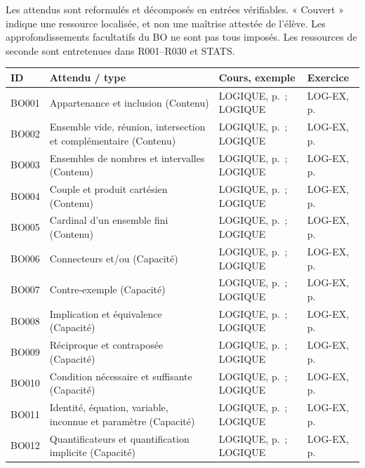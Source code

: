 \label{MATRICE}
Les attendus sont reformulés et décomposés en entrées vérifiables. « Couvert » indique une ressource localisée, et non une maîtrise attestée de l’élève. Les approfondissements facultatifs du BO ne sont pas tous imposés. Les ressources de seconde sont entretenues dans R001–R030 et STATS.
\small\begin{longtable}{p{.1\linewidth}p{.43\linewidth}p{.19\linewidth}p{.16\linewidth}}\toprule ID & Attendu / type & Cours, exemple & Exercice \\\midrule\endhead
BO001 & Appartenance et inclusion (Contenu) & LOGIQUE, p.\,\pageref{LOGIQUE} ; LOGIQUE & LOG-EX, p.\,\pageref{LOG-EX} \\
BO002 & Ensemble vide, réunion, intersection et complémentaire (Contenu) & LOGIQUE, p.\,\pageref{LOGIQUE} ; LOGIQUE & LOG-EX, p.\,\pageref{LOG-EX} \\
BO003 & Ensembles de nombres et intervalles (Contenu) & LOGIQUE, p.\,\pageref{LOGIQUE} ; LOGIQUE & LOG-EX, p.\,\pageref{LOG-EX} \\
BO004 & Couple et produit cartésien (Contenu) & LOGIQUE, p.\,\pageref{LOGIQUE} ; LOGIQUE & LOG-EX, p.\,\pageref{LOG-EX} \\
BO005 & Cardinal d’un ensemble fini (Contenu) & LOGIQUE, p.\,\pageref{LOGIQUE} ; LOGIQUE & LOG-EX, p.\,\pageref{LOG-EX} \\
BO006 & Connecteurs et/ou (Capacité) & LOGIQUE, p.\,\pageref{LOGIQUE} ; LOGIQUE & LOG-EX, p.\,\pageref{LOG-EX} \\
BO007 & Contre-exemple (Capacité) & LOGIQUE, p.\,\pageref{LOGIQUE} ; LOGIQUE & LOG-EX, p.\,\pageref{LOG-EX} \\
BO008 & Implication et équivalence (Capacité) & LOGIQUE, p.\,\pageref{LOGIQUE} ; LOGIQUE & LOG-EX, p.\,\pageref{LOG-EX} \\
BO009 & Réciproque et contraposée (Capacité) & LOGIQUE, p.\,\pageref{LOGIQUE} ; LOGIQUE & LOG-EX, p.\,\pageref{LOG-EX} \\
BO010 & Condition nécessaire et suffisante (Capacité) & LOGIQUE, p.\,\pageref{LOGIQUE} ; LOGIQUE & LOG-EX, p.\,\pageref{LOG-EX} \\
BO011 & Identité, équation, variable, inconnue et paramètre (Capacité) & LOGIQUE, p.\,\pageref{LOGIQUE} ; LOGIQUE & LOG-EX, p.\,\pageref{LOG-EX} \\
BO012 & Quantificateurs et quantification implicite (Capacité) & LOGIQUE, p.\,\pageref{LOGIQUE} ; LOGIQUE & LOG-EX, p.\,\pageref{LOG-EX} \\

\end{longtable}
